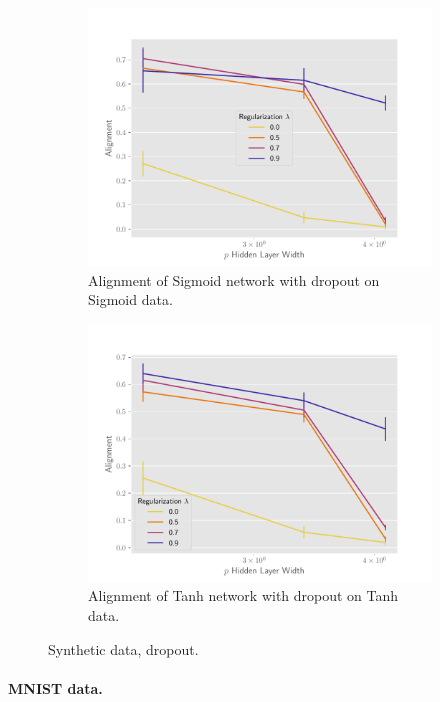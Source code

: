 \begin{figure}[h]
\medskip

\begin{subfigure}[b]{.49\textwidth}
  \centering
  \includegraphics[width=\linewidth]{figures/align_nn_sigmoid_autograd_dropout_v2.pdf}
  \caption{Alignment of Sigmoid network with dropout on Sigmoid data.}
  \label{fig:align_nn_sigmoid_autograd_dropout}
\end{subfigure}\hfill
\begin{subfigure}[b]{.49\textwidth}
  \centering
  \includegraphics[width=\linewidth]{figures/align_nn_tanh_autograd_dropout_v2.pdf}
  \caption{Alignment of Tanh network with dropout on Tanh data.}
  \label{fig:align_nn_tanh_autograd_dropout}
\end{subfigure}
\caption{Synthetic data, dropout. }
\label{fig:synthetic-dropout}
\end{figure}

\paragraph{MNIST data.}